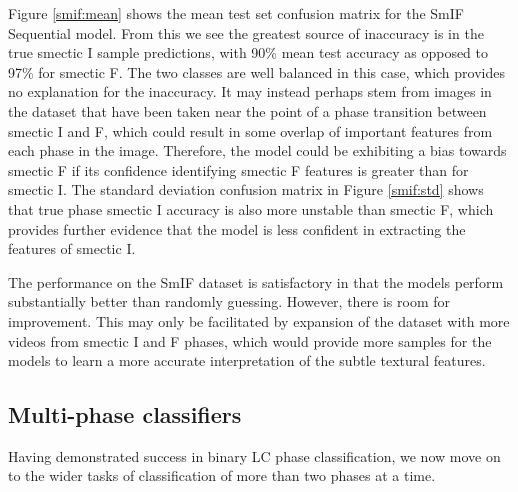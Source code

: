 \documentclass[12pt]{article}
\begin{document}
Figure \ref{smif:mean} shows the mean test set confusion matrix for the SmIF Sequential model. From this we see the greatest source of inaccuracy is in the true smectic I sample predictions, with 90\% mean test accuracy as opposed to 97\% for smectic F. The two classes are well balanced in this case, which provides no explanation for the inaccuracy. It may instead perhaps stem from images in the dataset that have been taken near the point of a phase transition between smectic I and F, which could result in some overlap of important features from each phase in the image. Therefore, the model could be exhibiting a bias towards smectic F if its confidence identifying smectic F features is greater than for smectic I. The standard deviation confusion matrix in Figure \ref{smif:std} shows that true phase smectic I accuracy is also more unstable than smectic F, which provides further evidence that the model is less confident in extracting the features of smectic I.

The performance on the SmIF dataset is satisfactory in that the models perform substantially better than randomly guessing. However, there is room for improvement. This may only be facilitated by expansion of the dataset with more videos from smectic I and F phases, which would provide more samples for the models to learn a more accurate interpretation of the subtle textural features.

\subsection{Multi-phase classifiers}
Having demonstrated success in binary LC phase classification, we now move on to the wider tasks of classification of more than two phases at a time.
\end{document}
